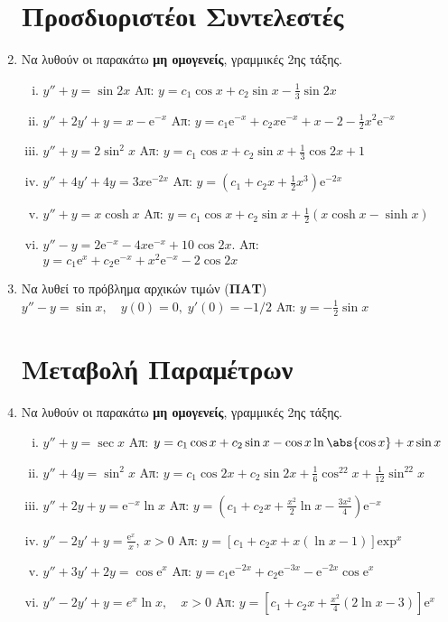 \begin{enumerate}
  \section*{Προσδιοριστέοι Συντελεστές}

\item Να λυθούν οι παρακάτω \textbf{μη ομογενείς}, γραμμικές 2ης τάξης.
  \begin{enumerate}[i)]
    \item $y''+y=\sin 2x$ \hfill Απ: $y=c_1\cos x+c_2\sin x-\frac{1}{3}\sin 2x$
    \item $y''+2y'+y=x- \mathrm{e}^{-x}$
      \hfill Απ: $y=c_1 \mathrm{e}^{-x}+c_2x \mathrm{e}^{-x}+x-2-\frac{1}{2}x^2
      \mathrm{e}^{-x}$
     \item $y''+y=2\sin^2 x$ \hfill Απ: $y=c_1\cos x+c_2\sin x+\frac{1}{3}\cos 2x+1$
     \item $y''+4y'+4y=3x \mathrm{e}^{-2x}$ \hfill Απ: $y=(c_1+c_2x+\frac{1}{2}x^3)
       \mathrm{e}^{-2x}$
    \item $y''+y=x\cosh x$ 
      \hfill Απ: $y=c_1\cos x+c_2\sin x +\frac{1}{2}(x\cosh x-\sinh x)$
    \item $y''-y=2 \mathrm{e}^{-x} - 4x \mathrm{e}^{-x} + 10 \cos{2x}$.
      \hfill Απ: $ y= c_{1} \mathrm{e}^{x} + c_{2} \mathrm{e}^{-x} + x^{2} 
      \mathrm{e}^{-x} - 2 \cos{2x}$ 
  \end{enumerate}

\item Να λυθεί το πρόβλημα αρχικών τιμών (\textbf{ΠΑΤ}) 
  $
  y''-y=\sin x, \quad y(0)=0,\; y'(0)=-{1}/{2}
  $
  \hfill Απ: $y= -\frac{1}{2}\sin x$

  \section*{Μεταβολή Παραμέτρων}

\item Να λυθούν οι παρακάτω \textbf{μη ομογενείς}, γραμμικές 2ης τάξης.
  \begin{enumerate}[i)]
    \item $y''+y=\sec x$ 
      \hfill Απ: $y=c_1\cos x+c_2\sin x - \cos x\ln\abs{\cos x}+x\sin x$
    \item $y''+4y=\sin^2x$ 
      \hfill Απ: $y=c_1\cos 2x+c_2\sin 2x+\frac{1}{6}\cos^22x+\frac{1}{12}\sin^22x$
    \item $y''+2y+y= \mathrm{e}^{-x}\ln x$ 
      \hfill Απ: $y=(c_1+c_2x+\frac{x^2}{2}\ln x-\frac{3x^2}{4}) \mathrm{e}^{-x}$
    \item $y''-2y'+y=\frac{\mathrm{e}^x}{x}$, \quad $x>0$ 
      \hfill Απ: $y= [c_{1} + c_{2} x + x(\ln x-1)] \mathrm{exp}^{x} $
    \item $y''+3y'+2y=\cos \mathrm{e}^{x}$ \hfill Απ: $y= c_{1} \mathrm{e}^{-2x} + 
      c_{2} \mathrm{e}^{-3x} - \mathrm{e}^{-2x}\cos \mathrm{e}^{x}$
    \item $y''-2y'+y=e^{x}\ln x, \quad x>0$ 
      \hfill Απ: $y= [c_{1}+ c_{2}x + \frac{x^{2}}{4}(2\ln x-3)] \mathrm{e}^{x}$
  \end{enumerate}


\end{enumerate}
